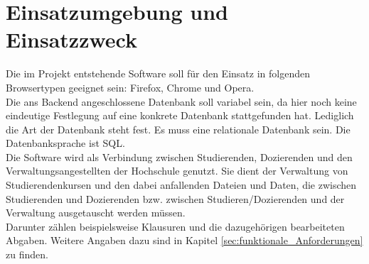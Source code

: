 
\chapter{Einsatzumgebung und Einsatzzweck}
Die im Projekt entstehende Software soll für den Einsatz in folgenden Browsertypen geeignet sein: Firefox, Chrome und Opera. \\
Die ans Backend angeschlossene Datenbank soll variabel sein, da hier noch keine eindeutige Festlegung auf eine konkrete Datenbank stattgefunden hat. Lediglich die Art der Datenbank steht fest. Es muss eine relationale Datenbank sein. Die Datenbanksprache ist SQL.\\

Die Software wird als Verbindung zwischen Studierenden, Dozierenden und den Verwaltungsangestellten der Hochschule genutzt. Sie dient der Verwaltung von Studierendenkursen und den dabei anfallenden Dateien und Daten, die zwischen Studierenden und Dozierenden bzw. zwischen Studieren/Dozierenden und der Verwaltung ausgetauscht werden müssen. \\
Darunter zählen beispielsweise Klausuren und die dazugehörigen bearbeiteten Abgaben. Weitere Angaben dazu sind in Kapitel \ref{sec:funktionale_Anforderungen} zu finden. 
